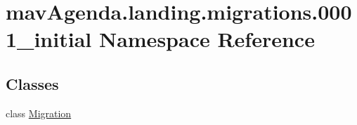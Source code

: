 \hypertarget{namespacemavAgenda_1_1landing_1_1migrations_1_10001__initial}{}\section{mav\+Agenda.\+landing.\+migrations.0001\+\_\+initial Namespace Reference}
\label{namespacemavAgenda_1_1landing_1_1migrations_1_10001__initial}
\subsection*{Classes}
\begin{DoxyCompactItemize}
\item 
class \mbox{\hyperlink{classmavAgenda_1_1landing_1_1migrations_1_10001__initial_1_1Migration}{Migration}}
\end{DoxyCompactItemize}

